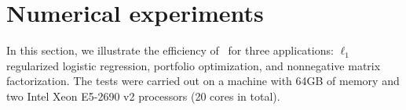 \section{Numerical experiments}
In this section, we illustrate the efficiency of \pkg~for three applications: $\ell_1$ regularized logistic regression, portfolio optimization,  and nonnegative matrix factorization. The tests were carried out on a machine with 64GB of memory and two Intel Xeon E5-2690 v2 processors (20 cores in total).




